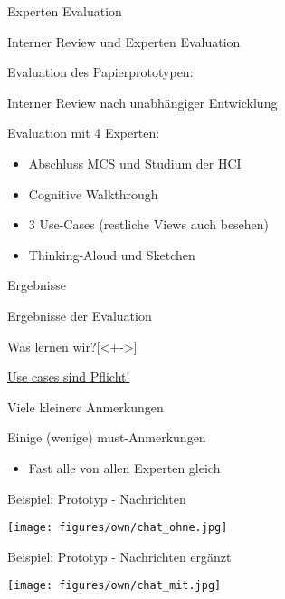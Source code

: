\begin{subsection}{Experten Evaluation}
\begin{frame}{Interner Review und Experten Evaluation}

\begin{titleditems}{Evaluation des Papierprototypen:}
\pause
\item Interner Review nach unabhängiger Entwicklung\\
\pause

\item Evaluation mit 4 Experten:\\
\pause
	\begin{itemize}
	\item Abschluss MCS und Studium der HCI
	\item Cognitive Walkthrough
	\item 3 Use-Cases (restliche Views auch besehen)
	\item Thinking-Aloud und Sketchen
	\end{itemize}
\end{titleditems}



\end{frame}
\end{subsection} %

\begin{subsection}{Ergebnisse}

\begin{frame}{Ergebnisse der Evaluation}

\begin{titleditems}{Was lernen wir?}[<+->]
\pause
\item \underline{Use cases sind Pflicht!}
\item Viele kleinere Anmerkungen
\item Einige (wenige) must-Anmerkungen
	\begin{itemize}
	\item[\strong{$\rightarrow$}]Fast alle von allen Experten gleich
	\end{itemize}
\end{titleditems}

\end{frame}


\begin{frame}{Beispiel: Prototyp - Nachrichten}

\centering\texttt{[image: figures/own/chat\_ohne.jpg]}

\end{frame}


\begin{frame}{Beispiel: Prototyp - Nachrichten ergänzt}

\centering\texttt{[image: figures/own/chat\_mit.jpg]}

\end{frame}

\end{subsection} %


